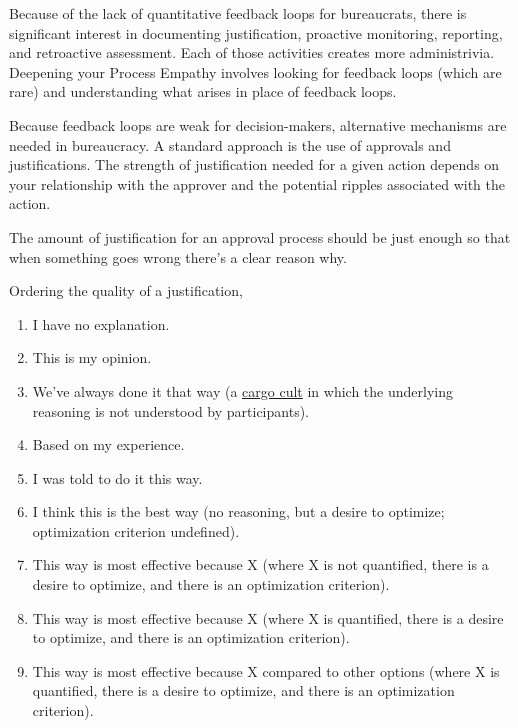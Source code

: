 Because of the lack of quantitative feedback loops for bureaucrats, there is significant interest in documenting justification, proactive monitoring, reporting, and retroactive assessment. Each of those activities creates more administrivia. Deepening your Process Empathy involves looking for feedback loops (which are rare) and understanding what arises in place of feedback loops.


Because feedback loops are weak for decision-makers, alternative mechanisms are needed in bureaucracy. A standard approach is the use of approvals and justifications. The strength of justification needed for a given action depends on your relationship with the approver and the potential ripples associated with the action. 

The amount of justification for an approval process should be just enough so that when something goes wrong there's a clear reason why. 

Ordering the quality of a justification,
\begin{enumerate}
    \item I have no explanation.
    \item This is my opinion.
    \item We've always done it that way (a \href{https://en.wikipedia.org/wiki/Cargo_cult}{cargo cult} in which the underlying reasoning is not understood by participants).
    \iftoggle{WPinmargin}{\marginpar{$>$Wikipedia: Cargo cult}}{ }%
    \item Based on my experience.
    \item I was told to do it this way.
    \item I think this is the best way (no reasoning, but a desire to optimize; optimization criterion undefined).
    \item This way is most effective because X (where X is not quantified, there is a desire to optimize, and there is an optimization criterion).
    \item This way is most effective because X (where X is quantified, there is a desire to optimize, and there is an optimization criterion).
    \item This way is most effective because X compared to other options (where X is quantified, there is a desire to optimize, and there is an optimization criterion).
\end{enumerate}

